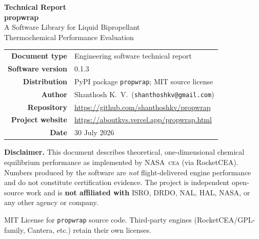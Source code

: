 \documentclass[11pt,a4paper]{report}
\newcommand{\pw}{\texttt{propwrap}}
\newcommand{\cea}{\textsc{cea}}
\begin{document}
\begin{titlepage}
  \centering
  \vspace*{1.2cm}
  {\Large\bfseries Technical Report}\\[0.6cm]
  {\huge\bfseries propwrap}\\[0.35cm]
  {\Large A Software Library for Liquid Bipropellant\\
  Thermochemical Performance Evaluation}\\[1.2cm]

  \begin{tabular}{rl}
    \textbf{Document type} & Engineering software technical report \\
    \textbf{Software version} & 0.1.3 \\
    \textbf{Distribution} & PyPI package \texttt{propwrap}; MIT source license \\
    \textbf{Author} & Shanthosh K.\ V.\ (\texttt{shanthoshkv@gmail.com}) \\
    \textbf{Repository} & \url{https://github.com/shanthoshkv/propwrap} \\
    \textbf{Project website} & \url{https://aboutkvs.vercel.app/propwrap.html} \\
    \textbf{Date} & 30 July 2026 \\
  \end{tabular}

  \vfill
  \begin{minipage}{0.92\textwidth}
    \small
    \textbf{Disclaimer.}
    This document describes theoretical, one-dimensional chemical equilibrium
    performance as implemented by NASA~\cea{} (via RocketCEA). Numbers produced
    by the software are \emph{not} flight-delivered engine performance and do not
    constitute certification evidence. The project is independent open-source work
    and is \textbf{not affiliated with} ISRO, DRDO, NAL, HAL, NASA, or any other
    agency or company.
  \end{minipage}

  \vspace{1.2cm}
  {\footnotesize MIT License for \pw{} source code.
  Third-party engines (RocketCEA/GPL-family, Cantera, etc.) retain their own licenses.}
\end{titlepage}

\tableofcontents
\newpage
\listoffigures
\listoftables
\newpage
\end{document}
